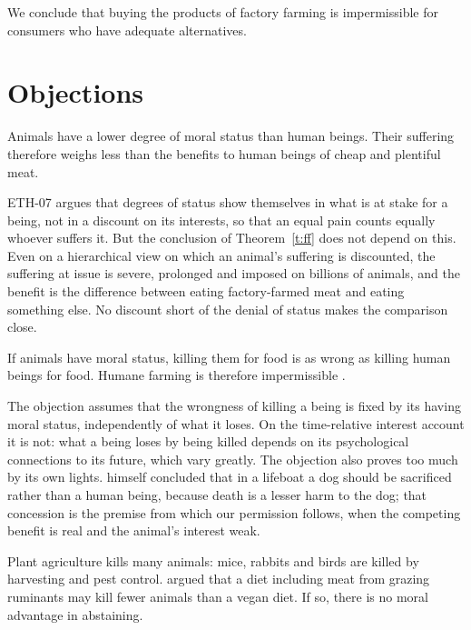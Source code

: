 \documentclass{situationist-preprint}
\begin{document}
We conclude that buying the products of factory farming is impermissible for consumers who have adequate alternatives.

\section{Objections}

\begin{objection}
Animals have a lower degree of moral status than human beings. Their suffering therefore weighs less than the benefits to human beings of cheap and plentiful meat.
\end{objection}

\begin{reply}
ETH-07 argues that degrees of status show themselves in what is at stake for a being, not in a discount on its interests, so that an equal pain counts equally whoever suffers it. But the conclusion of Theorem~\ref{t:ff} does not depend on this. Even on a hierarchical view on which an animal's suffering is discounted, the suffering at issue is severe, prolonged and imposed on billions of animals, and the benefit is the difference between eating factory-farmed meat and eating something else. No discount short of the denial of status makes the comparison close.
\end{reply}

\begin{objection}[Abolition]
If animals have moral status, killing them for food is as wrong as killing human beings for food. Humane farming is therefore impermissible \citep{Regan1983}.
\end{objection}

\begin{reply}
The objection assumes that the wrongness of killing a being is fixed by its having moral status, independently of what it loses. On the time-relative interest account it is not: what a being loses by being killed depends on its psychological connections to its future, which vary greatly. The objection also proves too much by its own lights. \citet{Regan1983} himself concluded that in a lifeboat a dog should be sacrificed rather than a human being, because death is a lesser harm to the dog; that concession is the premise from which our permission follows, when the competing benefit is real and the animal's interest weak.
\end{reply}

\begin{objection}
Plant agriculture kills many animals: mice, rabbits and birds are killed by harvesting and pest control. \citet{Davis2003} argued that a diet including meat from grazing ruminants may kill fewer animals than a vegan diet. If so, there is no moral advantage in abstaining.
\end{objection}
\end{document}
